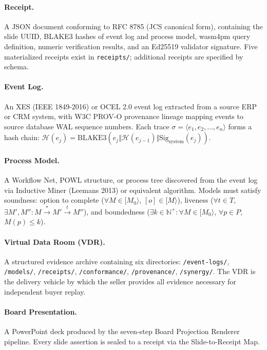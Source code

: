 \paragraph{Receipt.} A JSON document conforming to RFC 8785 (JCS canonical form), containing
the slide UUID, BLAKE3 hashes of event log and process model, wasm4pm query definition,
numeric verification results, and an Ed25519 validator signature. Five materialized receipts
exist in \texttt{receipts/}; additional receipts are specified by schema.

\paragraph{Event Log.} An XES (IEEE 1849-2016) or OCEL 2.0 event log extracted from a source
ERP or CRM system, with W3C PROV-O provenance lineage mapping events to source database WAL
sequence numbers. Each trace $\sigma = \langle e_1, e_2, \ldots, e_n \rangle$ forms a hash
chain: $\mathcal{H}(e_j) = \text{BLAKE3}(e_j \Vert \mathcal{H}(e_{j-1}) \Vert
\text{Sig}_{\text{system}}(e_j))$.

\paragraph{Process Model.} A Workflow Net, POWL structure, or process tree discovered from the
event log via Inductive Miner (Leemans 2013) or equivalent algorithm. Models must satisfy
soundness: option to complete ($\forall M \in [M_0\rangle$, $[o] \in [M\rangle$), liveness
($\forall t \in T$, $\exists M', M'' : M \xrightarrow{*} M' \xrightarrow{t} M''$), and
boundedness ($\exists k \in \mathbb{N}^+ : \forall M \in [M_0\rangle$, $\forall p \in P$,
$M(p) \le k$).

\paragraph{Virtual Data Room (VDR).} A structured evidence archive containing six directories:
\texttt{/event-logs/}, \texttt{/models/}, \texttt{/receipts/}, \texttt{/conformance/},
\texttt{/provenance/}, \texttt{/synergy/}. The VDR is the delivery vehicle by which the seller
provides all evidence necessary for independent buyer replay.

\paragraph{Board Presentation.} A PowerPoint deck produced by the seven-step Board Projection
Renderer pipeline. Every slide assertion is sealed to a receipt via the Slide-to-Receipt Map.

